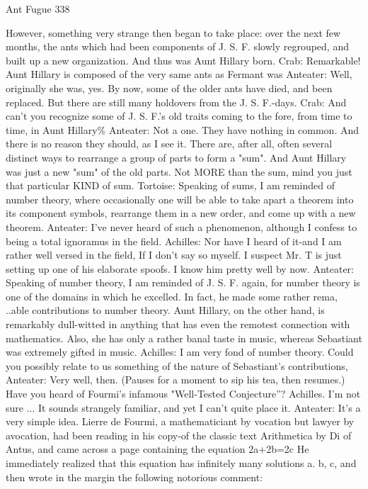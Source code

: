 Ant Fugue                                                                                338

    However, something very strange then began to take place: over the next few
    months, the ants which had been components of J. S. F. slowly regrouped, and built
    up a new organization. And thus was Aunt Hillary born.
Crab: Remarkable! Aunt Hillary is composed of the very same ants as Fermant was
Anteater: Well, originally she was, yes. By now, some of the older ants have died, and
    been replaced. But there are still many holdovers from the J. S. F.-days.
Crab: And can't you recognize some of J. S. F.'s old traits coming to the fore, from time
    to time, in Aunt Hillary\%
Anteater: Not a one. They have nothing in common. And there is no reason they should,
    as I see it. There are, after all, often several distinct ways to rearrange a group of
    parts to form a "sum". And Aunt Hillary was just a new "sum" of the old parts. Not
    MORE than the sum, mind you just that particular KIND of sum.
Tortoise: Speaking of sums, I am reminded of number theory, where occasionally one
    will be able to take apart a theorem into its component symbols, rearrange them in a
    new order, and come up with a new theorem.
Anteater: I've never heard of such a phenomenon, although I confess to being a total
    ignoramus in the field.
Achilles: Nor have I heard of it-and I am rather well versed in the field, If I don't say so
    myself. I suspect Mr. T is just setting up one of his elaborate spoofs. I know him
    pretty well by now. Anteater: Speaking of number theory, I am reminded of J. S. F.
    again, for number theory is one of the domains in which he excelled. In fact, he made
    some rather rema, ..able contributions to number theory. Aunt Hillary, on the other
    hand, is remarkably dull-witted in anything that has even the remotest connection
    with mathematics. Also, she has only a rather banal taste in music, whereas
    Sebastiant was extremely gifted in music.
Achilles: I am very fond of number theory. Could you possibly relate to us something of
    the nature of Sebastiant's contributions,
Anteater: Very well, then. (Pauses for a moment to sip his tea, then resumes.)
    Have you heard of Fourmi's infamous "Well-Tested Conjecture”?
Achilles. I'm not sure ... It sounds strangely familiar, and yet I can't quite place it.
Anteater: It's a very simple idea. Lierre de Fourmi, a mathematiciant by vocation but
    lawyer by avocation, had been reading in his copy-of the classic text Arithmetica by
    Di of Antus, and came across a page containing the equation
                                        2a+2b=2c
    He immediately realized that this equation has infinitely many solutions a. b, c, and
    then wrote in the margin the following notorious comment:




